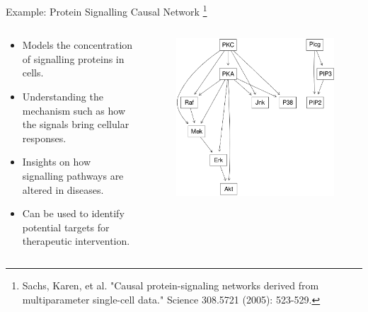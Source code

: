 \documentclass{beamer}
\begin{document}
\begin{frame}{Example: Protein Signalling Causal Network \footnote{Sachs, Karen, et al. "Causal protein-signaling networks derived from multiparameter single-cell data." Science 308.5721 (2005): 523-529.}}
	\begin{columns}
		\begin{column}{0.5\textwidth}
			\begin{itemize}
				\item Models the concentration of signalling proteins in cells.
				\item Understanding the mechanism such as how the signals bring cellular responses.
				\item Insights on how signalling pathways are altered in diseases.
				\item Can be used to identify potential targets for therapeutic intervention.
			\end{itemize}
		\end{column}
		\begin{column}{0.5\textwidth}
			\begin{figure}
				\centering
				\includegraphics[scale=0.22]{imgs/sachs.png}
			\end{figure}
		\end{column}
	\end{columns}
\end{frame}
\end{document}
